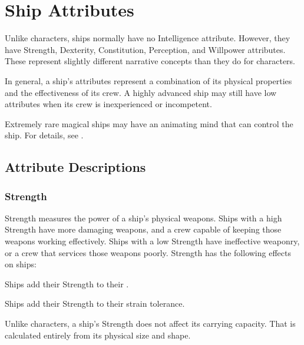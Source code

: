 \section{Ship Attributes}
    Unlike characters, ships normally have no Intelligence attribute.
    However, they have Strength, Dexterity, Constitution, Perception, and Willpower attributes.
    These represent slightly different narrative concepts than they do for characters.

    In general, a ship's attributes represent a combination of its physical properties and the effectiveness of its crew.
    A highly advanced ship may still have low attributes when its crew is inexperienced or incompetent.

    Extremely rare magical ships may have an animating mind that can control the ship.
    For details, see .

    \subsection{Attribute Descriptions}

        \subsubsection{Strength}
            Strength measures the power of a ship's physical weapons.
            Ships with a high Strength have more damaging weapons, and a crew capable of keeping those weapons working effectively.
            Ships with a low Strength have ineffective weaponry, or a crew that services those weapons poorly.
            Strength has the following effects on ships:
            \begin{raggeditemize}
                \item Ships add their Strength to their .
                \item Ships add their Strength to their strain tolerance.
            \end{raggeditemize}

            Unlike characters, a ship's Strength does not affect its carrying capacity.
            That is calculated entirely from its physical size and shape.

